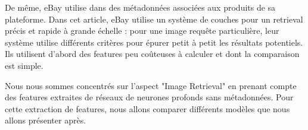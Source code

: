 De même, eBay utilise dans \cite{yang2017visual} des métadonnées associées aux produits de sa plateforme. Dans cet
article, eBay utilise un système de couches pour un retrieval précis et rapide à grande échelle : pour une image requête
particulière, leur système utilise différents critères pour épurer petit à petit les résultats potentiels. Ils utilisent
d'abord des features peu coûteuses à calculer et dont la comparaison est simple.

Nous nous sommes concentrés sur l'aspect "Image Retrieval" en prenant compte des features extraites de réseaux de
neurones profonds sans métadonnées. Pour cette extraction de features, nous allons comparer différents modèles que nous
allons présenter après.
